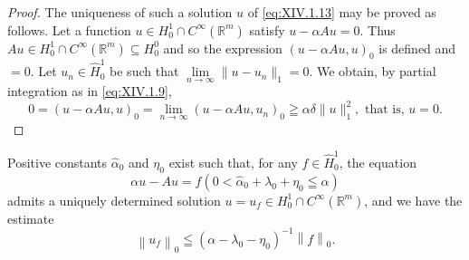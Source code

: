 \begin{proof}
The uniqueness of such a solution $u$ of \eqref{eq:XIV.1.13} may be proved as follows. Let a function $u \in H_0^1 \cap C^\infty(\mathbb{R}^{m})$ satisfy $u - \alpha A u = 0$. Thus $Au \in H_0^1 \cap C^\infty(\mathbb{R}^{m}) \subseteq H_0^0$ and so the expression $(u - \alpha A u, u)_0$ is defined and $= 0$. Let $u_n \in \hat{H}_0^1$ be such that $\lim\limits_{n \to \infty} \|u - u_n\|_1 = 0$. We obtain, by partial integration as in \eqref{eq:XIV.1.9}, 
\[
0 = (u - \alpha A u, u) _{0} = \lim\limits _{n \rightarrow \infty} (u - \alpha A u, u _{n}) _{0} \geqq \alpha \delta \| u \| _{1} ^{2}, \text{ that is, } u = 0.
\]
\end{proof}

\begin{corollary}\label{cor:XIV.1.Corollary.1} Positive constants $\hat{\alpha}_{0}$ and $\eta_{0}$ exist such that, for any $f\in\hat{H}_{0}^{1}$, the equation 
\begin{equation}\label{eq:XIV.1.16}
\alpha u - A u = f \left(0 < \hat {\alpha} _{0} + \lambda_{0} + \eta_{0} \leqq \alpha\right)
\end{equation}
admits a uniquely determined solution $u = u_{f} \in H_{0}^{1} \cap C^{\infty}(\mathbb{R}^{m})$, and we have the estimate 
\begin{equation}\label{eq:XIV.1.17}
\left\| u _{f} \right\| _{0} \leqq (\alpha - \lambda_{0} - \eta_{0}) ^{-1} \left\| f \right\| _{0}.
\end{equation}
\end{corollary}

